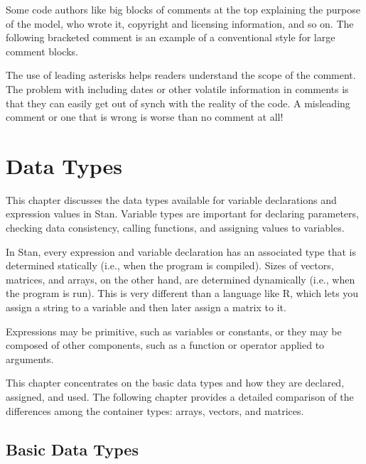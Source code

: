 Some code authors like big blocks of comments at the top explaining
the purpose of the model, who wrote it, copyright and licensing
information, and so on.  The following bracketed comment is an
example of a conventional style for large comment blocks.
%
\begin{stancode}
/*
 * Item-Response Theory PL3 Model
 * -----------------------------------------------------
 * Copyright: Joe Schmoe  <joe@schmoe.com>
 * Date:  19 September 2012
 * License: GPLv3
 */

data {
  // ...
\end{stancode}
%
The use of leading asterisks helps readers understand the scope of the
comment.  The problem with including dates or other volatile
information in comments is that they can easily get out of synch with
the reality of the code.  A misleading comment or one that is wrong is
worse than no comment at all!


\chapter{Data Types}

\noindent
This chapter discusses the data types available for variable
declarations and expression values in Stan.  Variable types are
important for declaring parameters, checking data consistency, calling
functions, and assigning values to variables.

In Stan, every expression and variable declaration has an associated
type that is determined statically (i.e., when the program is
compiled).  Sizes of vectors, matrices, and arrays, on the other hand,
are determined dynamically (i.e., when the program is run).  This is
very different than a language like R, which lets you assign a string
to a variable and then later assign a matrix to it.

Expressions may be primitive, such as variables or constants, or they
may be composed of other components, such as a function or operator
applied to arguments.  

This chapter concentrates on the basic data types and how they are
declared, assigned, and used.  The following chapter provides a
detailed comparison of the differences among the container types:
arrays, vectors, and matrices.

\section{Basic Data Types}

